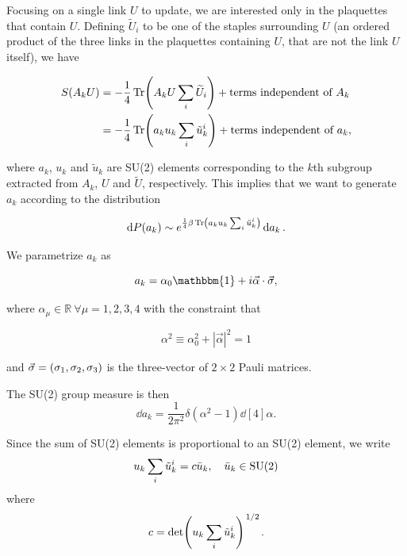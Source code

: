 \documentclass[reqno,12pt]{article}
\numberwithin{equation}{section}
\newcommand{\SU}{\mathrm{SU}}
\newcommand{\id}{\mathbbm{1}}
\begin{document}
Focusing on a single link $U$ to update, we are interested only in the plaquettes that contain $U$. Defining
$\widetilde{U}_i$ to be one of the staples surrounding $U$ (an ordered product of the three links in the plaquettes
containing $U$, that are not the link $U$ itself), we have 

\begin{align}
	S(A_k U) &= -\frac{1}{4} \Tr(A_k U \sum_i \widetilde{U}_i) + \text{terms independent of } A_k \\
	&= -\frac{1}{4} \Tr(a_k u_k \sum_i \tilde{u}_k^i) + \text{terms independent of } a_k, 
\end{align}

where $a_k$, $u_k$ and $\tilde{u}_k$ are SU(2) elements corresponding to the $k$th
subgroup extracted from $A_k$, $U$ and $\widetilde{U}$, respectively. This implies that we want to generate
$a_k$ according to the distribution

\begin{equation}
	\dd{P(a_k)} \sim e^{\frac{1}{4}\beta\Tr(a_k u_k \sum_i \tilde{u}_k^i)} \dd{a_k}.
\end{equation}

We parametrize $a_k$ as

\begin{equation} \label{eq:su2parametrization}
	a_k = \alpha_0 \id + i \vec{\alpha} \cdot \vec{\sigma},
\end{equation}

where $\alpha_\mu \in \mathbb{R} \ \forall \mu = 1, 2, 3, 4$ with the constraint that 

\begin{equation}
	\alpha^2 \equiv \alpha_0^2 + |\vec{\alpha}|^2 = 1
\end{equation} 

and $\vec{\sigma} = \qty(\sigma_1, \sigma_2, \sigma_3)$ is the three-vector of $2 \times 2$ Pauli matrices. 

The SU(2) group measure is then
\begin{equation}
	\dd{a_k} = \frac{1}{2\pi^2} \delta(\alpha^2 - 1) \dd[4]{\alpha}.
\end{equation}

Since the sum of SU(2) elements is proportional to an SU(2) element, we write
\begin{equation}
	u_k \sum_i \tilde{u}_k^i = c \bar{u}_k \qc \bar{u}_k \in \SU(2)
\end{equation}
where 
\begin{equation}
	c = \det(u_k \sum_i \tilde{u}_k^i)^{\flatfrac{1}{2}}.
\end{equation}
\end{document}
